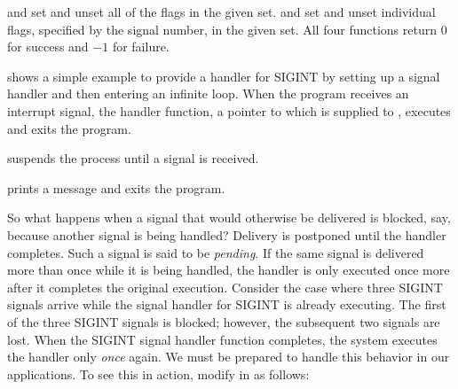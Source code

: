 \noindent {} and
 set and
unset all of the flags in the given set. 
 and
 set and unset individual flags,
specified by the
signal number, in the given set.  All four functions return $0$ for
success and $-1$ for failure.

 shows a simple 
example to
provide a handler for SIGINT by setting up a signal handler and then
entering an infinite loop.  When the program receives an interrupt
signal, the handler function, a pointer to which is supplied to
,
executes and exits the program.


\begin{topcode}


\begin{bottomcode}



\end{bottomcode}


 suspends the process until a signal is received.


 prints a message and exits the program.

\end{topcode}

So what happens when a signal that would otherwise be delivered is
blocked, say, because another signal is being handled?
Delivery is postponed until the handler completes. Such a signal is said to
be \emph{pending}.
  If the same signal is delivered more than once
while it is being handled, the handler is only executed
once more after it completes the original execution.
Consider the case where three SIGINT signals arrive while
the signal handler for SIGINT is already executing.  The first of the
three SIGINT signals is blocked; however, the subsequent two signals
are lost.  When the SIGINT signal handler function completes, the
system executes the handler only \emph{once} again.  We must be
prepared to handle this behavior in our applications.
To see this in action, modify 
 in  as follows:

